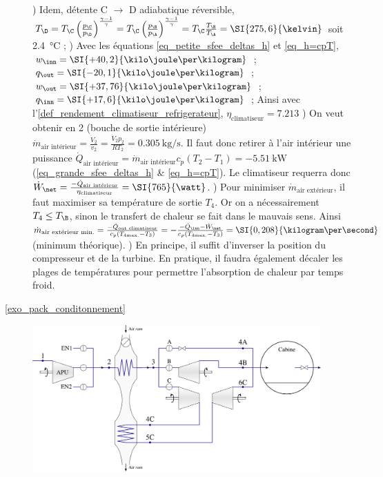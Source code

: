 \begin{description}
				) Idem, détente C $\to$ D adiabatique réversible, $T_\D = T_\C \left(\frac{p_\C}{p_\D}\right)^{\frac{\gamma - 1}{\gamma}} = T_\C \left(\frac{p_\B}{p_\A}\right)^{\frac{\gamma - 1}{\gamma}} = T_\C \frac{T_\B}{T_\A} = \SI{275,6}{\kelvin}$ soit \SI{2,4}{\degreeCelsius} ;
				) Avec les équations \ref{eq_petite_sfee_deltas_h} et \ref{eq_h=cpT}, $w_\inn = \SI{+40,2}{\kilo\joule\per\kilogram}$ ; 
						$q_\out = \SI{-20,1}{\kilo\joule\per\kilogram}$ ; 
						$w_\out = \SI{+37,76}{\kilo\joule\per\kilogram}$ ; 
						$q_\inn = \SI{+17,6}{\kilo\joule\per\kilogram}$ ; 
						Ainsi avec l’\cref{def_rendement_climatiseur_refrigerateur}, $\eta_\text{climatiseur} = \num{7,213}$
				) On veut obtenir en 2 (bouche de sortie intérieure) $\dot m_\text{air intérieur} = \frac{\dot V_2}{v_2} = \frac{\dot V_2 p_2}{R T_2} = \SI{0,305}{\kilogram\per\second}$. 
						Il faut donc retirer à l’air intérieur une puissance $\dot Q_\text{air intérieur} = \dot m_\text{air intérieur} c_p (T_2 - T_1) = \SI{-5,51}{\kilo\watt}$ (\ref{eq_grande_sfee_deltas_h} \& \ref{eq_h=cpT}).
						Le climatiseur requerra donc $\dot W_\net = \frac{-\dot Q_\text{air intérieur}}{\eta_\text{climatiseur}} = \SI{765}{\watt}$.
				) Pour minimiser $\dot m_\text{air extérieur}$, il faut maximiser sa température de sortie $T_4$. Or on a nécessairement $T_4 \leq T_\B$, sinon le transfert de chaleur se fait dans le mauvais sens. Ainsi $\dot m_\text{air extérieur min.} = \frac{-\dot Q_\text{out climatiseur}}{c_p (T_{4 \text{max.}} - T_3)} = -\frac{-\dot Q_\inn - \dot W_\net}{c_p (T_{4 \text{max.}} - T_3)} = \SI{0,208}{\kilogram\per\second}$ (minimum théorique).
				\tab{}) En principe, il suffit d’inverser la position du compresseur et de la turbine. En pratique, il faudra également décaler les plages de températures pour permettre l’absorption de chaleur par temps froid.
	\item[\ref{exo_pack_conditonnement}]
			\includegraphics[width=0.9\textwidth]{images/exo_sol_circuit_acm.png}\onlyamphibook{\\}

\end{description}
